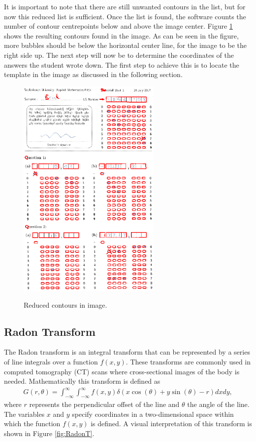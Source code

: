 It is important to note that there are still unwanted contours in the list, but for now this reduced list is sufficient. Once the list is found, the software counts the number of contour centrepoints below and above the image center. Figure \ref{fig:reduced} shows the resulting contours found in the image. As can be seen in the figure, more bubbles should be below the horizontal center line, for the image to be the right side up. The next step will now be to determine the coordinates of the answers the student wrote down. The first step to achieve this is to locate the template in the image as discussed in the following section.

\begin{figure}
  \centering
  \includegraphics[width=7cm]{Reduced}\\
  \caption{Reduced contours in image.}
  \label{fig:reduced}
\end{figure}

\subsection{Radon Transform}
\label{sec:RadonTransform}
The Radon transform is an integral transform that can be represented by a series of line integrals over a function $f(x,y)$. These transforms are commonly used in computed tomography (CT) scans where cross-sectional images of the body is needed. Mathematically this transform is defined as 
\begin{align}
G(r,\theta) = \int_{-\infty}^{\infty} \int_{-\infty}^{\infty} f(x, y) \delta(x\cos(\theta) + y\sin(\theta) - r) dx dy,
\label{eqn:radon}
\end{align}where $r$ represents the perpendicular offset of the line and $\theta$ the angle of the line. The variables $x$ and $y$ specify coordinates in a two-dimensional space within which the function $f(x,y)$ is defined.  A visual interpretation of this transform is shown in Figure \ref{fig:RadonT}.  

